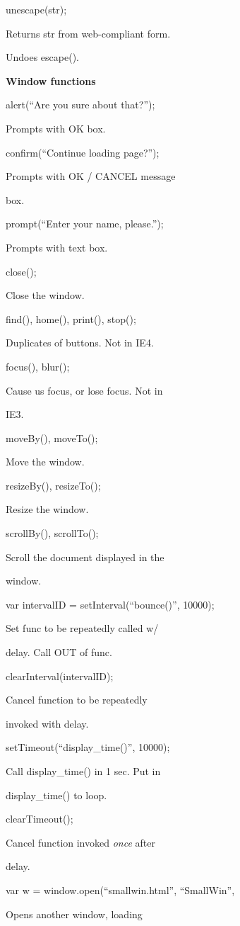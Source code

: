 \documentclass[
]{article}
\begin{document}
unescape(str);

Returns str from web-compliant form.

Undoes escape().

\textbf{Window functions}

alert(``Are you sure about that?'');

Prompts with OK box.

confirm(``Continue loading page?'');

Prompts with OK / CANCEL message

box.

prompt(``Enter your name, please.'');

Prompts with text box.

close();

Close the window.

find(), home(), print(), stop();

Duplicates of buttons. Not in IE4.

focus(), blur();

Cause us focus, or lose focus. Not in

IE3.

moveBy(), moveTo();

Move the window.

resizeBy(), resizeTo();

Resize the window.

scrollBy(), scrollTo();

Scroll the document displayed in the

window.

var intervalID = setInterval(``bounce()'', 10000);

Set func to be repeatedly called w/

delay. Call OUT of func.

clearInterval(intervalID);

Cancel function to be repeatedly

invoked with delay.

setTimeout(``display\_time()'', 10000);

Call display\_time() in 1 sec. Put in

display\_time() to loop.

clearTimeout();

Cancel function invoked \emph{once} after

delay.

var w = window.open(``smallwin.html'', ``SmallWin'',

Opens another window, loading
\end{document}
